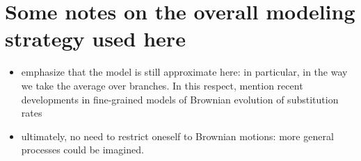 \documentclass[usletter]{article}
\begin{document}
\section{Some notes on the overall modeling strategy used here}

\begin{itemize}
\item
emphasize that the model is still approximate here: in particular, in the way we take the average over branches. In this respect, mention recent developments in fine-grained models of Brownian evolution of substitution rates
\item
ultimately, no need to restrict oneself to Brownian motions: more general processes could be imagined.
\end{itemize}




\end{document}
